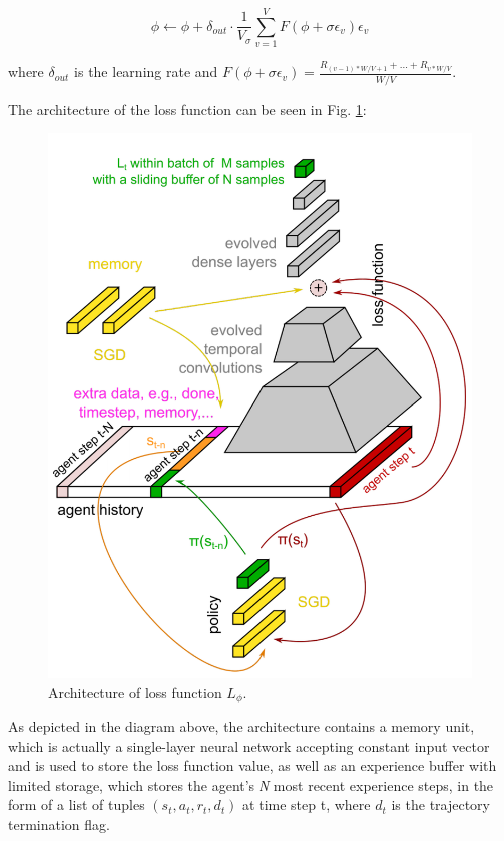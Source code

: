 \[\phi\gets\phi+\delta_{out}\cdot\frac{1}{V_\sigma}\sum_{v=1}^{V}F(\phi+\sigma\epsilon_v)\epsilon_v\]

where $\delta_{out}$ is the learning rate and $F(\phi+\sigma\epsilon_v) = \frac{R_{(v-1)*W/V+1}+...+R_{v*W/V}}{W/V}$.

\par
The architecture of the loss function can be seen in Fig. \ref{loss-architecture}:
\begin{figure}
	\includegraphics[scale=0.5]{loss-architecture.png}
	\centering
	\caption{Architecture of loss function $L_\phi$.}
	\label{loss-architecture}
\end{figure}

\par
As depicted in the diagram above, the architecture contains a memory unit, which is actually a single-layer neural network accepting constant input vector and is used to store the loss function value, as well as an experience buffer with limited storage, which stores the agent's \textit{N} most recent experience steps, in the form of a list of tuples $(s_t,a_t,r_t,d_t)$ at time step t, where \textit{$d_t$} is the trajectory termination flag.

